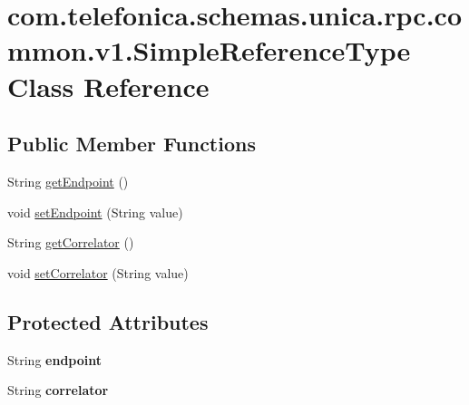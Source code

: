 \hypertarget{classcom_1_1telefonica_1_1schemas_1_1unica_1_1rpc_1_1common_1_1v1_1_1SimpleReferenceType}{
\section{com.telefonica.schemas.unica.rpc.common.v1.SimpleReferenceType Class Reference}
\label{classcom_1_1telefonica_1_1schemas_1_1unica_1_1rpc_1_1common_1_1v1_1_1SimpleReferenceType}
}
\subsection*{Public Member Functions}
\begin{DoxyCompactItemize}
\item 
String \hyperlink{classcom_1_1telefonica_1_1schemas_1_1unica_1_1rpc_1_1common_1_1v1_1_1SimpleReferenceType_af56bfbf03420689b59e633240cc01896}{getEndpoint} ()
\item 
void \hyperlink{classcom_1_1telefonica_1_1schemas_1_1unica_1_1rpc_1_1common_1_1v1_1_1SimpleReferenceType_a3ea97fb5be08195e847c98336593094e}{setEndpoint} (String value)
\item 
String \hyperlink{classcom_1_1telefonica_1_1schemas_1_1unica_1_1rpc_1_1common_1_1v1_1_1SimpleReferenceType_a1198096736c31cc72aee3f69f7182245}{getCorrelator} ()
\item 
void \hyperlink{classcom_1_1telefonica_1_1schemas_1_1unica_1_1rpc_1_1common_1_1v1_1_1SimpleReferenceType_a7cf34b0ba8a19daed21daa54f859dfc4}{setCorrelator} (String value)
\end{DoxyCompactItemize}
\subsection*{Protected Attributes}
\begin{DoxyCompactItemize}
\item 
\hypertarget{classcom_1_1telefonica_1_1schemas_1_1unica_1_1rpc_1_1common_1_1v1_1_1SimpleReferenceType_a81b8cdd7c10b1b850b440d17a422879e}{
String {\bfseries endpoint}}
\label{classcom_1_1telefonica_1_1schemas_1_1unica_1_1rpc_1_1common_1_1v1_1_1SimpleReferenceType_a81b8cdd7c10b1b850b440d17a422879e}

\item 
\hypertarget{classcom_1_1telefonica_1_1schemas_1_1unica_1_1rpc_1_1common_1_1v1_1_1SimpleReferenceType_a1a37c46761e5473ba5b5379e668d0951}{
String {\bfseries correlator}}
\label{classcom_1_1telefonica_1_1schemas_1_1unica_1_1rpc_1_1common_1_1v1_1_1SimpleReferenceType_a1a37c46761e5473ba5b5379e668d0951}

\end{DoxyCompactItemize}


